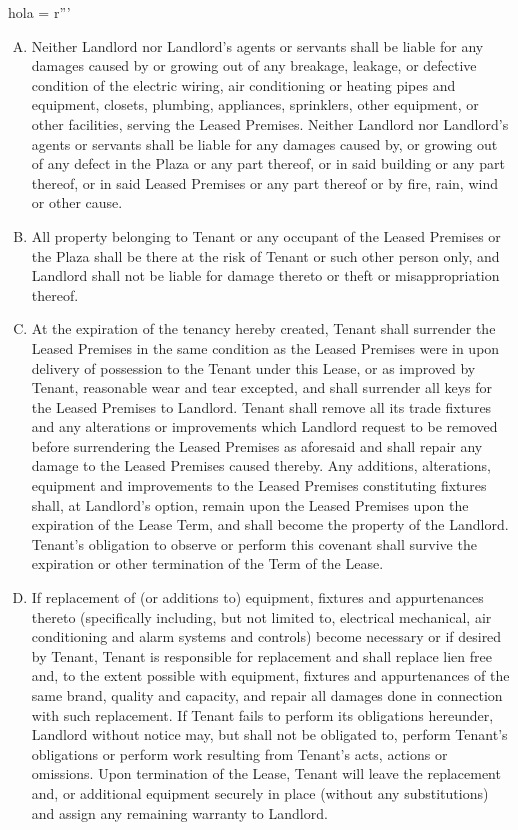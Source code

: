 hola = r'''\documentclass{article}
\begin{document}
\begin{enumerate}[(A)]
    \item	Neither Landlord nor Landlord’s agents or servants shall be liable for any damages caused by or growing out of any breakage, leakage, or defective condition of the electric wiring, air conditioning or heating pipes and equipment, closets, plumbing, appliances, sprinklers, other equipment, or other facilities, serving the Leased Premises.  Neither Landlord nor Landlord’s agents or servants shall be liable for any damages caused by, or growing out of any defect in the Plaza or any part thereof, or in said building or any part thereof, or in said Leased Premises or any part thereof or by fire, rain, wind or other cause.
    \item	All property belonging to Tenant or any occupant of the Leased Premises or the Plaza shall be there at the risk of Tenant or such other person only, and Landlord shall not be liable for damage thereto or theft or misappropriation thereof.
    \item	At the expiration of the tenancy hereby created, Tenant shall surrender the Leased Premises in the same condition as the Leased Premises were in upon delivery of possession to the Tenant under this Lease, or as improved by Tenant, reasonable wear and tear excepted, and shall surrender all keys for the Leased Premises to Landlord.  Tenant shall remove all its trade fixtures and any alterations or improvements which Landlord request to be removed before surrendering the Leased Premises as aforesaid and shall repair any damage to the Leased Premises caused thereby.  Any additions, alterations, equipment and improvements to the Leased Premises constituting fixtures shall, at Landlord’s option, remain upon the Leased Premises upon the expiration of the Lease Term, and shall become the property of the Landlord.  Tenant’s obligation to observe or perform this covenant shall survive the expiration or other termination of the Term of the Lease.
    \item	If replacement of (or additions to) equipment, fixtures and appurtenances thereto (specifically including, but not limited to, electrical mechanical, air conditioning and alarm systems and controls) become necessary or if desired by Tenant, Tenant is responsible for replacement and shall replace lien free and, to the extent possible with equipment, fixtures and appurtenances of the same brand, quality and capacity, and repair all damages done in connection with such replacement.  If Tenant fails to perform its obligations hereunder, Landlord without notice may, but shall not be obligated to, perform Tenant’s obligations or perform work resulting from Tenant’s acts, actions or omissions.  Upon termination of the Lease, Tenant will leave the replacement and, or additional equipment securely in place (without any substitutions) and assign any remaining warranty to Landlord.
    \end{enumerate}
    
\end{document}
